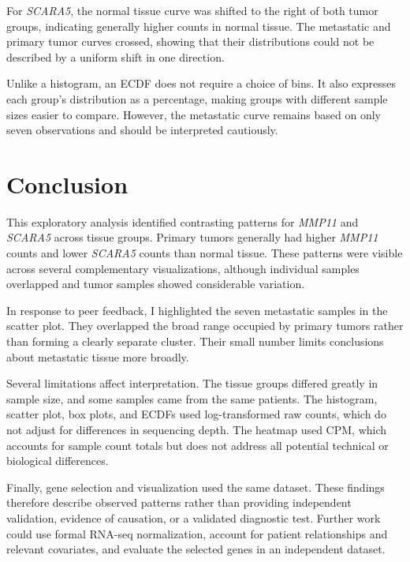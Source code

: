 \documentclass[11pt]{article}
\begin{document}
For \textit{SCARA5}, the normal tissue curve was
shifted to the right of both tumor groups,
indicating generally higher counts in normal tissue.
The metastatic and primary tumor curves crossed,
showing that their distributions could not be
described by a uniform shift in one direction.

Unlike a histogram, an ECDF does not require
a choice of bins. It also expresses each group's
distribution as a percentage, making groups
with different sample sizes easier to compare.
However, the metastatic curve remains based
on only seven observations and should be
interpreted cautiously.

\clearpage
\section{Conclusion}

This exploratory analysis identified contrasting
patterns for \textit{MMP11} and \textit{SCARA5}
across tissue groups. Primary tumors generally
had higher \textit{MMP11} counts and lower
\textit{SCARA5} counts than normal tissue.
These patterns were visible across several
complementary visualizations, although individual
samples overlapped and tumor samples showed
considerable variation.

In response to peer feedback, I highlighted
the seven metastatic samples in the scatter plot.
They overlapped the broad range occupied by
primary tumors rather than forming a clearly
separate cluster. Their small number limits
conclusions about metastatic tissue more broadly.

Several limitations affect interpretation.
The tissue groups differed greatly in sample size,
and some samples came from the same patients.
The histogram, scatter plot, box plots, and ECDFs
used log-transformed raw counts, which do not
adjust for differences in sequencing depth.
The heatmap used CPM, which accounts for sample
count totals but does not address all potential
technical or biological differences.

Finally, gene selection and visualization used
the same dataset. These findings therefore
describe observed patterns rather than providing
independent validation, evidence of causation,
or a validated diagnostic test. Further work
could use formal RNA-seq normalization,
account for patient relationships and relevant
covariates, and evaluate the selected genes
in an independent dataset.


\clearpage
\end{document}
